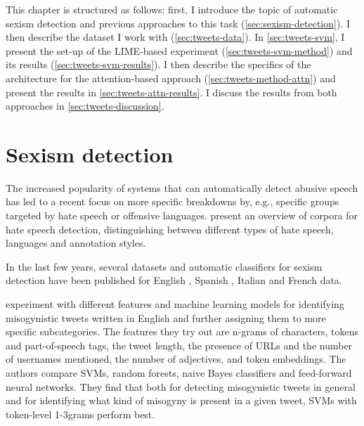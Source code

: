 \label{chap:tweets}

This chapter is structured as follows:
first, I introduce the topic of automatic sexism detection and previous approaches to this task (\autoref{sec:sexism-detection}).
I then describe the dataset I work with (\autoref{sec:tweets-data}).
In \autoref{sec:tweets-svm}, I present the set-up of the LIME-based experiment (\autoref{sec:tweets-svm-method}) and its results (\autoref{sec:tweets-svm-results}).
I then describe the specifics of the architecture for the attention-based approach (\autoref{sec:tweets-method-attn}) and present the results in \autoref{sec:tweets-attn-results}.
I discuss the results from both approaches in \autoref{sec:tweets-discussion}.

\section{Sexism detection}
\label{sec:sexism-detection}

The increased popularity of systems that can automatically detect abusive speech has led to a recent focus on more specific breakdowns by, e.g., specific groups targeted by hate speech or offensive languages.
\citet{poletto2020resources} present an overview of corpora for hate speech detection, distinguishing between different types of hate speech, languages and annotation styles.

In the last few years, several datasets and automatic classifiers for sexism detection have been published for English \citep{jha2017compliment,anzovino2018automatic,fersini2018overview,frenda2019online},
Spanish \citep{fersini2018overview,rodriguez2020automatic},
Italian \citep{fersini2020ami} and 
French \citep{chiril2020annotated} data.

\citet{anzovino2018automatic} experiment with different features and machine learning models for identifying misogynistic tweets written in English and further assigning them to more specific subcategories.
The features they try out are n-grams of characters, tokens and part-of-speech tags, the tweet length, the presence of URLs and the number of usernames mentioned, the number of adjectives, and token embeddings.
The authors compare SVMs, random forests, naive Bayes classifiers and feed-forward neural networks.
They find that both for detecting misogynistic tweets in general and for identifying what kind of misogyny is present in a given tweet, SVMs with token-level 1-3grams perform best.

